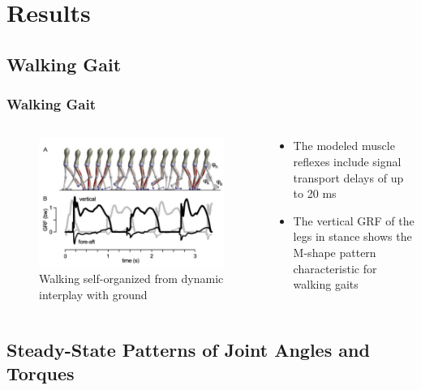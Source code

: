 \documentclass[10pt]{beamer}
\begin{document}
	\section{Results}
	\subsection[Results]{Walking Gait}
	
	\begin{frame}
		\frametitle{Walking Gait}	
		
		\begin{columns}
			\begin{column}{.5\textwidth}
				\begin{figure}
					\centering
					\includegraphics[height=.45\textheight]{images/graphic_3.pdf}
					\caption{Walking self-organized from dynamic interplay with ground}	
				\end{figure}
			\end{column}
			\begin{column}{.5\textwidth}
				\begin{itemize}
					\item The modeled muscle reflexes include signal transport delays of up to 20 ms
					\item The vertical GRF of the legs in stance shows the M-shape pattern characteristic for walking gaits
				\end{itemize}
			\end{column}
		\end{columns}
	\end{frame}
	
	\subsection[Results]{Steady-State Patterns of Joint Angles and Torques}
	
\end{document}
